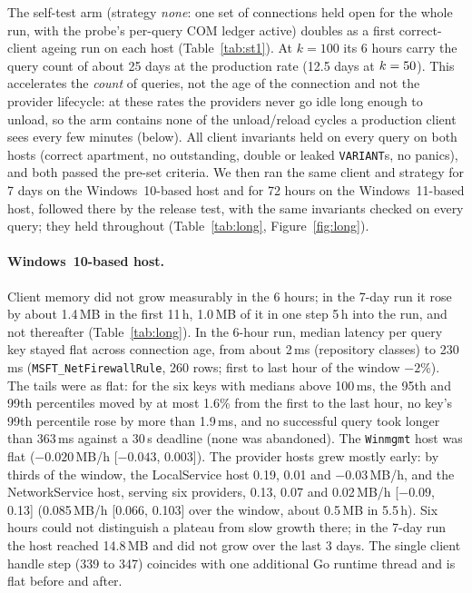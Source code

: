 \documentclass[letterpaper,twocolumn,10pt]{article}
\newcommand{\code}[1]{\texttt{\small #1}}
\begin{document}
The self-test arm (strategy \emph{none}: one set of connections held open for the whole run, with the probe's per-query COM ledger active) doubles as a first correct-client ageing run on each host (Table~\ref{tab:st1}).
At $k=100$ its 6 hours carry the query count of about 25 days at the production rate (12.5 days at $k=50{}$).
This accelerates the \emph{count} of queries, not the age of the connection and not the provider lifecycle: at these rates the providers never go idle long enough to unload, so the arm contains none of the unload/reload cycles a production client sees every few minutes (below).
All client invariants held on every query on both hosts (correct apartment, no outstanding, double or leaked \code{VARIANT}s, no panics), and both passed the pre-set criteria.
We then ran the same client and strategy for 7 days on the Windows~10-based host and for 72 hours on the Windows~11-based host, followed there by the release test, with the same invariants checked on every query; they held throughout (Table~\ref{tab:long}, Figure~\ref{fig:long}).

\paragraph{Windows~10-based host.}
Client memory did not grow measurably in the 6 hours; in the 7-day run it rose by about 1.4\,MB in the first 11\,h, 1.0\,MB of it in one step 5\,h into the run, and not thereafter (Table~\ref{tab:long}).
In the 6-hour run, median latency per query key stayed flat across connection age, from about 2\,ms (repository classes) to 230\,ms (\code{MSFT\_NetFirewallRule}, 260 rows; first to last hour of the window $-2$\%).
The tails were as flat: for the six keys with medians above 100\,ms, the 95th and 99th percentiles moved by at most 1.6\% from the first to the last hour, no key's 99th percentile rose by more than 1.9\,ms, and no successful query took longer than 363\,ms against a 30\,s deadline (none was abandoned).
The \code{Winmgmt} host was flat ($-0.020$\,MB/h [$-0.043$, 0.003]).
The provider hosts grew mostly early: by thirds of the window, the LocalService host 0.19, 0.01 and $-0.03$\,MB/h, and the NetworkService host, serving six providers, 0.13, 0.07 and 0.02\,MB/h [$-0.09$, 0.13] (0.085\,MB/h [0.066, 0.103] over the window, about 0.5\,MB in 5.5\,h).
Six hours could not distinguish a plateau from slow growth there; in the 7-day run the host reached 14.8\,MB and did not grow over the last 3 days.
The single client handle step (339 to 347) coincides with one additional Go runtime thread and is flat before and after.
\end{document}

